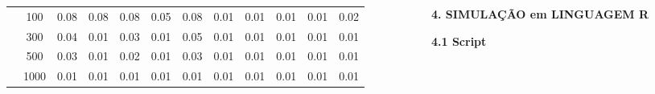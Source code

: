 \documentclass[final]{beamer}
\begin{document}
\begin{frame}[t]
\begin{columns}[t,totalwidth=0.6\paperwidth]
\begin{column}{0.45\paperwidth}
\begin{table}[H]
\begin{tabular}{c|c|c|c|c|c|c|c|c|c|c|c}
               & 100    &  0.08 & 0.08  &  0.08 & 0.05 & 0.08  & 0.01  & 0.01  & 0.01   & 0.01   & 0.02    \\
               & 300    &  0.04 & 0.01  &  0.03 & 0.01 & 0.05  & 0.01  & 0.01  & 0.01   & 0.01   & 0.01    \\
               & 500    &  0.03 & 0.01  &  0.02 & 0.01 & 0.03  & 0.01  & 0.01  & 0.01   & 0.01   & 0.01    \\
               & 1000   &  0.01 & 0.01  &  0.01 & 0.01 & 0.01  & 0.01  & 0.01  & 0.01   & 0.01   & 0.01    \\
    \hline \hline
    \end{tabular}
    \label{tab:inverted2}
\end{table}


\vspace{1em}
 \justifying
 
  \end{column}
  \hspace{0.02\paperwidth} 

  \begin{column}{0.45\textwidth}
 
{\large\bfseries 4. SIMULAÇÃO em LINGUAGEM R}\par
\justifying
\vspace{1.3cm}

{\large\bfseries 4.1 Script}\par
\vspace{1.3cm}


\end{column}
\end{columns}
\end{frame}
\end{document}
